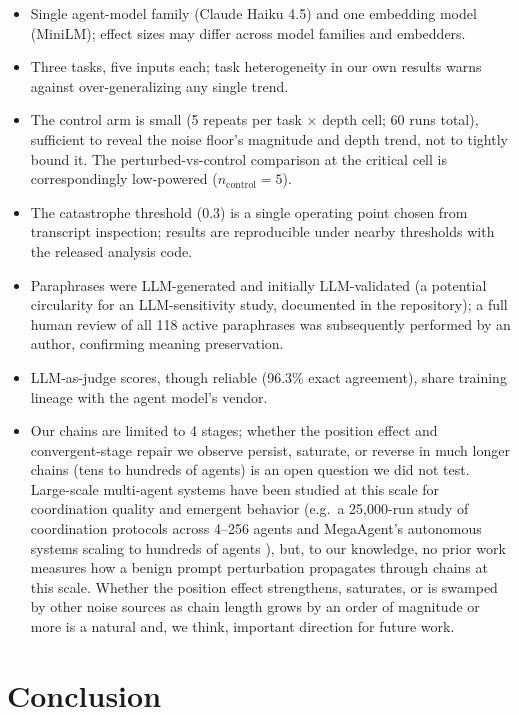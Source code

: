 \documentclass[11pt]{article}
\begin{document}
\begin{itemize}
  \item Single agent-model family (Claude Haiku 4.5) and one embedding model
  (MiniLM); effect sizes may differ across model families and embedders.
  \item Three tasks, five inputs each; task heterogeneity in our own results
  warns against over-generalizing any single trend.
  \item The control arm is small (5 repeats per task $\times$ depth cell; 60
  runs total), sufficient to reveal the noise floor's magnitude and depth
  trend, not to tightly bound it. The perturbed-vs-control comparison at the
  critical cell is correspondingly low-powered ($n_{\mathrm{control}} = 5$).
  \item The catastrophe threshold (0.3) is a single operating point chosen
  from transcript inspection; results are reproducible under nearby
  thresholds with the released analysis code.
  \item Paraphrases were LLM-generated and initially LLM-validated (a
  potential circularity for an LLM-sensitivity study, documented in the
  repository); a full human review of all 118 active paraphrases was
  subsequently performed by an author, confirming meaning preservation.
  \item LLM-as-judge scores, though reliable (96.3\% exact agreement), share
  training lineage with the agent model's vendor.
  \item Our chains are limited to 4 stages; whether the position effect and
  convergent-stage repair we observe persist, saturate, or reverse in much
  longer chains (tens to hundreds of agents) is an open question we did not
  test. Large-scale multi-agent systems have been studied at this scale for
  coordination quality and emergent behavior (e.g.\ a 25{,}000-run study of
  coordination protocols across 4--256 agents \citep{selforganizing2026} and
  MegaAgent's autonomous systems scaling to hundreds of agents
  \citep{megaagent2024}), but, to our knowledge, no prior work measures how a
  benign prompt perturbation propagates through chains at this scale. Whether
  the position effect strengthens, saturates, or is swamped by other noise
  sources as chain length grows by an order of magnitude or more is a natural
  and, we think, important direction for future work.
\end{itemize}

\section{Conclusion}
\end{document}
